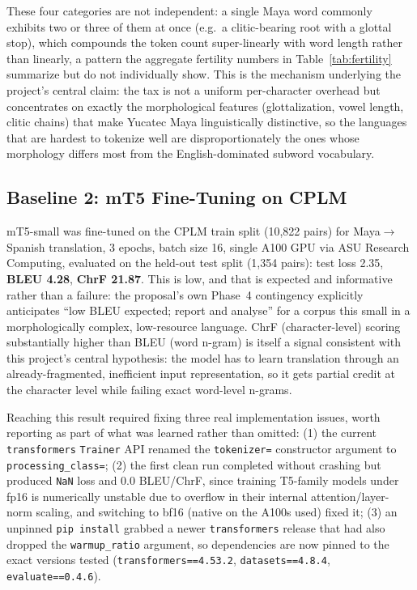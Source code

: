 \documentclass[11pt]{article}
\begin{document}
These four categories are not independent: a single Maya word commonly
exhibits two or three of them at once (e.g.\ a clitic-bearing root with a
glottal stop), which compounds the token count super-linearly with word
length rather than linearly, a pattern the aggregate fertility numbers in
Table~\ref{tab:fertility} summarize but do not individually show. This is the
mechanism underlying the project's central claim: the tax is not a uniform
per-character overhead but concentrates on exactly the morphological features
(glottalization, vowel length, clitic chains) that make Yucatec Maya
linguistically distinctive, so the languages that are hardest to tokenize
well are disproportionately the ones whose morphology differs most from the
English-dominated subword vocabulary.

\subsection{Baseline 2: mT5 Fine-Tuning on CPLM}

mT5-small was fine-tuned on the CPLM train split (10,822 pairs) for
Maya$\to$Spanish translation, 3 epochs, batch size 16, single A100 GPU via
ASU Research Computing, evaluated on the held-out test split (1,354 pairs):
test loss 2.35, \textbf{BLEU 4.28}, \textbf{ChrF 21.87}. This is low, and
that is expected and informative rather than a failure: the proposal's own
Phase~4 contingency explicitly anticipates ``low BLEU expected; report and
analyse'' for a corpus this small in a morphologically complex, low-resource
language. ChrF (character-level) scoring substantially higher than BLEU
(word n-gram) is itself a signal consistent with this project's central
hypothesis: the model has to learn translation through an already-fragmented,
inefficient input representation, so it gets partial credit at the character
level while failing exact word-level n-grams.

Reaching this result required fixing three real implementation issues, worth
reporting as part of what was learned rather than omitted: (1) the current
\texttt{transformers} \texttt{Trainer} API renamed the \texttt{tokenizer=}
constructor argument to \texttt{processing\_class=}; (2) the first clean run
completed without crashing but produced \texttt{NaN} loss and 0.0 BLEU/ChrF,
since training T5-family models under fp16 is numerically unstable due to overflow
in their internal attention/layer-norm scaling, and switching to bf16 (native
on the A100s used) fixed it; (3) an unpinned \texttt{pip install} grabbed a
newer \texttt{transformers} release that had also dropped the
\texttt{warmup\_ratio} argument, so dependencies are now pinned to the exact
versions tested (\texttt{transformers==4.53.2}, \texttt{datasets==4.8.4},
\texttt{evaluate==0.4.6}).
\end{document}
